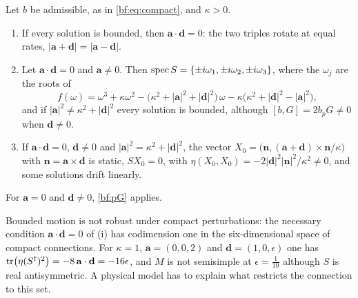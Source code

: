 \begin{theorem}
\label{bf:screen}
Let $b$ be admissible, as in \eqref{bf:eq:compact}, and $\kappa>0$.
\begin{enumerate}[label=(\roman*),leftmargin=2.2em]
\item If every solution is bounded, then $\mathbf a\cdot\mathbf d=0$: the two triples rotate at equal rates, $|\mathbf a+\mathbf d|=|\mathbf a-\mathbf d|$.
\item Let $\mathbf a\cdot\mathbf d=0$ and $\mathbf a\neq0$. Then $\operatorname{spec} S=\{\pm i\omega_1,\pm i\omega_2,\pm i\omega_3\}$, where the $\omega_j$ are the
roots of
\[
f(\omega)=\omega^3+\kappa\omega^2-\bigl(\kappa^2+|\mathbf a|^2+|\mathbf d|^2\bigr)\,\omega-\kappa\bigl(\kappa^2+|\mathbf d|^2-|\mathbf a|^2\bigr),
\]
and if $|\mathbf a|^2\neq\kappa^2+|\mathbf d|^2$ every solution is bounded, although $[b,G]=2b_pG\neq0$ when $\mathbf d\neq0$.
\item If $\mathbf a\cdot\mathbf d=0$, $\mathbf d\neq0$ and $|\mathbf a|^2=\kappa^2+|\mathbf d|^2$, the vector
$X_0=\bigl(\mathbf n,(\mathbf a+\mathbf d)\times\mathbf n/\kappa\bigr)$ with $\mathbf n=\mathbf a\times\mathbf d$ is static, $SX_0=0$, with
$\eta(X_0,X_0)=-2|\mathbf d|^2|\mathbf n|^2/\kappa^2\neq0$, and some solutions drift linearly.
\end{enumerate}
For $\mathbf a=0$ and $\mathbf d\neq0$, \cref{bf:pG} applies.
\end{theorem}

Bounded motion is not robust under compact perturbations: the necessary condition $\mathbf a\cdot\mathbf d=0$ of (i) has codimension one in the
six-dimensional space of compact connections. For $\kappa=1$, $\mathbf a=(0,0,2)$ and $\mathbf d=(1,0,\epsilon)$ one has $\operatorname{tr}\bigl(\eta(S^\dagger)^2\bigr)=-8\,\mathbf a\cdot\mathbf d=-16\epsilon$,
and $M$ is not semisimple at $\epsilon=\tfrac1{10}$ although $S$ is real antisymmetric. A physical model has to explain what restricts the connection to
this set.

